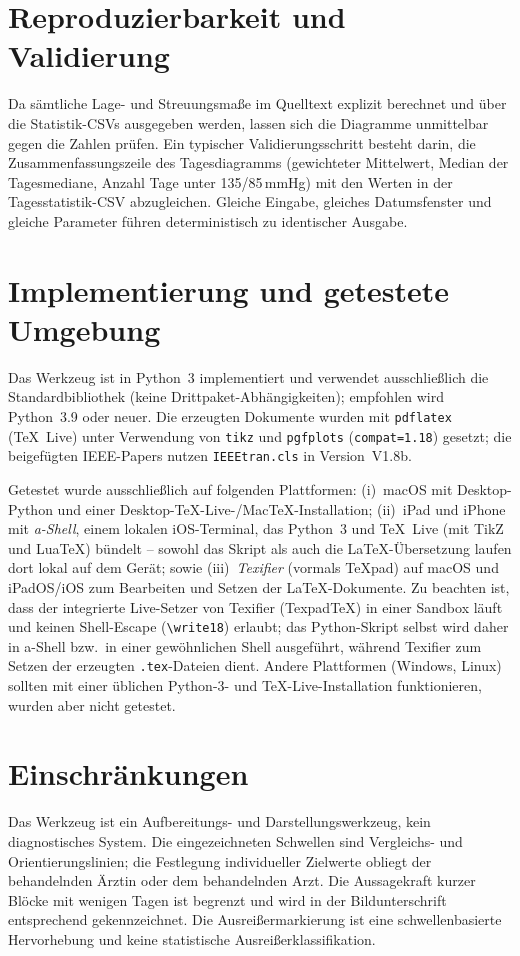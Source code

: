 \documentclass[conference]{IEEEtran}
\begin{document}
\section{Reproduzierbarkeit und Validierung}
Da sämtliche Lage- und Streuungsmaße im Quelltext explizit berechnet und über
die Statistik-CSVs ausgegeben werden, lassen sich die Diagramme unmittelbar
gegen die Zahlen prüfen. Ein typischer Validierungsschritt besteht darin, die
Zusammenfassungszeile des Tagesdiagramms (gewichteter Mittelwert, Median der
Tagesmediane, Anzahl Tage unter 135/85\,mmHg) mit den Werten in der
Tagesstatistik-CSV abzugleichen. Gleiche Eingabe, gleiches Datumsfenster und
gleiche Parameter führen deterministisch zu identischer Ausgabe.

\section{Implementierung und getestete Umgebung}
Das Werkzeug ist in Python~3 implementiert und verwendet ausschließlich die
Standardbibliothek (keine Drittpaket-Abhängigkeiten); empfohlen wird
Python~3.9 oder neuer. Die erzeugten Dokumente wurden mit \texttt{pdflatex}
(TeX~Live) unter Verwendung von \texttt{tikz} und \texttt{pgfplots}
(\texttt{compat=1.18}) gesetzt; die beigefügten IEEE-Papers nutzen
\texttt{IEEEtran.cls} in Version~V1.8b.

Getestet wurde ausschließlich auf folgenden Plattformen: (i)~macOS mit
Desktop-Python und einer Desktop-TeX-Live-/MacTeX-Installation; (ii)~iPad und
iPhone mit \emph{a-Shell}, einem lokalen iOS-Terminal, das Python~3 und
TeX~Live (mit TikZ und LuaTeX) bündelt -- sowohl das Skript als auch die
LaTeX-Übersetzung laufen dort lokal auf dem Gerät; sowie (iii)~\emph{Texifier}
(vormals TeXpad) auf macOS und iPadOS/iOS zum Bearbeiten und Setzen der
LaTeX-Dokumente. Zu beachten ist, dass der integrierte Live-Setzer von Texifier
(TexpadTeX) in einer Sandbox läuft und keinen Shell-Escape (\texttt{\textbackslash write18})
erlaubt; das Python-Skript selbst wird daher in a-Shell bzw.\ in einer
gewöhnlichen Shell ausgeführt, während Texifier zum Setzen der erzeugten
\texttt{.tex}-Dateien dient. Andere Plattformen (Windows, Linux) sollten mit
einer üblichen Python-3- und TeX-Live-Installation funktionieren, wurden aber
nicht getestet.

\section{Einschränkungen}
Das Werkzeug ist ein Aufbereitungs- und Darstellungswerkzeug, kein
diagnostisches System. Die eingezeichneten Schwellen sind Vergleichs- und
Orientierungslinien; die Festlegung individueller Zielwerte obliegt der
behandelnden Ärztin oder dem behandelnden Arzt. Die Aussagekraft kurzer Blöcke
mit wenigen Tagen ist begrenzt und wird in der Bildunterschrift entsprechend
gekennzeichnet. Die Ausreißermarkierung ist eine schwellenbasierte
Hervorhebung und keine statistische Ausreißerklassifikation.
\end{document}
